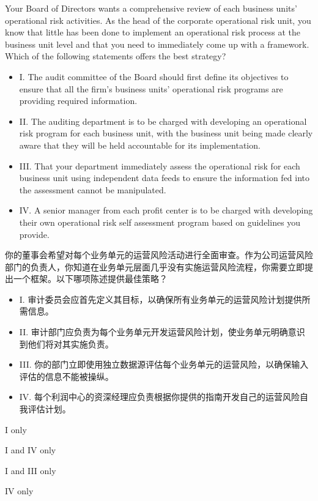 \documentclass{article}
\newcounter{question} %
\begin{document}
\begin{question}
    Your Board of Directors wants a comprehensive review of each business units' operational risk activities. As the head of the corporate operational risk unit, you know that little has been done to implement an operational risk process at the business unit level and that you need to immediately come up with a framework. Which of the following statements offers the best strategy?
    \begin{itemize}
        \item I. The audit committee of the Board should first define its objectives to ensure that all the firm's business units' operational risk programs are providing required information.
        \item II. The auditing department is to be charged with developing an operational risk program for each business unit, with the business unit being made clearly aware that they will be held accountable for its implementation.
        \item III. That your department immediately assess the operational risk for each business unit using independent data feeds to ensure the information fed into the assessment cannot be manipulated.
        \item IV. A senior manager from each profit center is to be charged with developing their own operational risk self assessment program based on guidelines you provide.
    \end{itemize}
    你的董事会希望对每个业务单元的运营风险活动进行全面审查。作为公司运营风险部门的负责人，你知道在业务单元层面几乎没有实施运营风险流程，你需要立即提出一个框架。以下哪项陈述提供最佳策略？
    \begin{itemize}
        \item I. 审计委员会应首先定义其目标，以确保所有业务单元的运营风险计划提供所需信息。
        \item II. 审计部门应负责为每个业务单元开发运营风险计划，使业务单元明确意识到他们将对其实施负责。
        \item III. 你的部门立即使用独立数据源评估每个业务单元的运营风险，以确保输入评估的信息不能被操纵。
        \item IV. 每个利润中心的资深经理应负责根据你提供的指南开发自己的运营风险自我评估计划。
    \end{itemize}
\end{question}

\begin{choices}
    \item I only
    \item I and IV only
    \item I and III only
    \item IV only
\end{choices}
\end{document}
